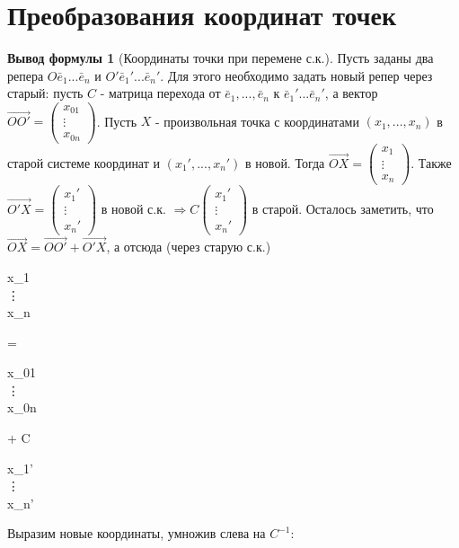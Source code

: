 \documentclass[a4paper, 12pt]{article}
\theoremstyle{definition}
\newtheorem*{formula}{Вывод формулы}
\newenvironment{boxedalign*}
  {\begin{equation*}\begin{lrbox}{\boxedalignbox}$\begin{aligned}}
  {\end{aligned}$\end{lrbox}\fbox{\usebox{\boxedalignbox}}\end{equation*}}
\begin{document}
	\section{Преобразования координат точек}
	\begin{formula}[Координаты точки при перемене с.к.]
		Пусть заданы два репера $O\bar{e}_{1}...\bar{e}_{n}$ и $O'\bar{e}_{1}'...\bar{e}_{n}'$. Для этого необходимо задать новый репер через старый: пусть $C$ - матрица перехода от $\bar{e}_{1},...,\bar{e}_{n}$ к $\bar{e}_{1}'...\bar{e}_{n}'$, а вектор $\overrightarrow{OO'} = \begin{pmatrix} x_{01} \\ \vdots \\ x_{0n} \end{pmatrix}$.
		Пусть $X$ - произвольная точка с координатами $(x_{1},...,x_{n})$ в старой системе координат и $(x_{1}',...,x_{n}')$ в новой. Тогда $\overrightarrow{OX} = \begin{pmatrix} x_{1} \\ \vdots \\ x_{n} \end{pmatrix}$. Также $\overrightarrow{O'X} = \begin{pmatrix} x_{1}' \\ \vdots \\ x_{n}' \end{pmatrix}$ в новой с.к. $\Rightarrow C\begin{pmatrix} x_{1}' \\ \vdots \\ x_{n}' \end{pmatrix}$ в старой. Осталось заметить, что $\overrightarrow{OX} = \overrightarrow{OO'} + \overrightarrow{O'X}$, а отсюда (через старую с.к.)
		\begin{boxedalign*}\begin{pmatrix} x_{1} \\ \vdots \\ x_{n} \end{pmatrix} = \begin{pmatrix} x_{01} \\ \vdots \\ x_{0n} \end{pmatrix} + C \begin{pmatrix} x_{1}' \\ \vdots \\ x_{n}' \end{pmatrix} \end{boxedalign*}
		Выразим новые координаты, умножив слева на $C^{-1}$:  

\end{formula}
\end{document}
